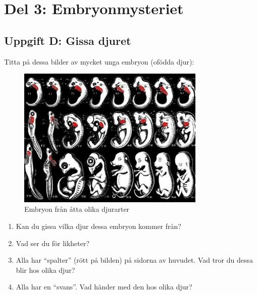 \documentclass[a4paper,11pt]{article}
\begin{document}
\section{Del 3: Embryonmysteriet}

\subsection{Uppgift D: Gissa djuret}

Titta på dessa bilder av mycket unga embryon (ofödda djur):

\begin{figure}[H]
\centering
\includegraphics[width=0.8\textwidth]{embryo-drawings.jpg}
\caption{Embryon från åtta olika djurarter}
\end{figure}
\begin{enumerate}
    \item Kan du gissa vilka djur dessa embryon kommer från?
    
    \vspace{2cm}
    
    \item Vad ser du för likheter?
    
    \vspace{2cm}
    
    \item Alla har ``spalter'' (rött på bilden) på sidorna av huvudet. Vad tror du dessa blir hos olika djur?
    
    \vspace{2cm}
    
    \item Alla har en ``svans''. Vad händer med den hos olika djur?
\end{enumerate}
\end{document}
